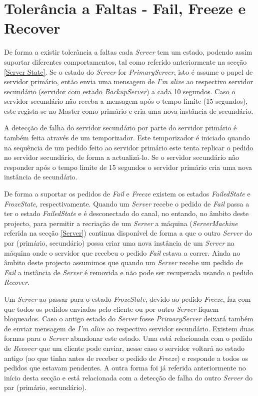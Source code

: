 \section{Tolerância a Faltas - Fail, Freeze e Recover}

De forma a existir tolerância a faltas cada \textit{Server} tem um estado, podendo assim suportar diferentes comportamentos, tal como referido anteriormente na secção \ref{Server State}. Se o estado do \textit{Server} for \textit{PrimaryServer}, isto é assume o papel de servidor primário, então envia uma mensagem de \textit{I’m alive} ao respectivo servidor secundário (servidor com estado \textit{BackupServer}) a cada 10 segundos. Caso o servidor secundário não receba a mensagem após o tempo limite (15 segundos), este regista-se no Master como primário e cria uma nova instância de secundário.

A detecção de falha do servidor secundário por parte do servidor primário é também feita através de um temporizador. Este temporizador é iniciado quando na sequência de um pedido feito ao servidor primário este tenta replicar o pedido no servidor secundário, de forma a actualizá-lo. Se o servidor secundário não responder após o tempo limite de 15 segundos o servidor primário cria uma nova instância de secundário.

De forma a suportar os pedidos de \textit{Fail} e \textit{Freeze} existem os estados \textit{FailedState} e \textit{FrozeState}, respectivamente. Quando um \textit{Server} recebe o pedido de \textit{Fail} passa a ter o estado \textit{FailedState} e é desconectado do canal, no entando, no âmbito deste projecto, para permitir a recriação de um \textit{Server} a máquina (\textit{ServerMachine} referida na secção \ref{Server}) continua disponível de forma a que o outro \textit{Server} do par (primário, secundário) possa criar uma nova instância de um \textit{Server} na máquina onde o servidor que recebeu o pedido \textit{Fail} estava a correr. Ainda no âmbito deste projecto assumimos que quando um \textit{Server} recebe um pedido de \textit{Fail} a instância de \textit{Server} é removida e não pode ser recuperada usando o pedido \textit{Recover}.

Um \textit{Server} ao passar para o estado \textit{FrozeState}, devido ao pedido \textit{Freeze}, faz com que todos os pedidos enviados pelo cliente ou por outro \textit{Server} fiquem bloqueados. Caso o antigo estado do \textit{Server} fosse \textit{PrimaryServer} deixará também de enviar mensagem de \textit{I’m alive} ao respectivo servidor secundário. Existem duas formas para o \textit{Server} abandonar este estado. Uma está relacionada com o pedido de \textit{Recover} que um cliente pode enviar, nesse caso o servidor voltará ao estado antigo (ao que tinha antes de receber o pedido de \textit{Freeze}) e responde a todos os pedidos que estavam pendentes. A outra forma foi já referida anteriormente no início desta secção e está relacionada com a detecção de falha do outro \textit{Server} do par (primário, secundário).